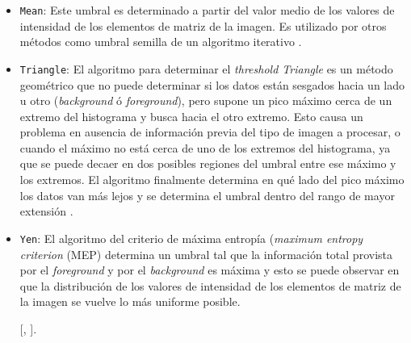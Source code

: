 \begin{itemize}
\item \texttt{Mean}: Este umbral es determinado a partir del valor medio de los valores de intensidad de los elementos de matriz de la imagen. Es utilizado por otros métodos como umbral semilla de un algoritmo iterativo \cite{GLASBEY}. 

\item \texttt{Triangle}: El algoritmo para determinar el \textit{threshold Triangle} es un método geométrico que no puede determinar si los datos están sesgados hacia un lado u otro (\textit{background} ó \textit{foreground}), pero supone un pico máximo cerca de un extremo del histograma y busca hacia el otro extremo. Esto causa un problema en ausencia de información previa del tipo de imagen a procesar, o cuando el máximo no está cerca de uno de los extremos del histograma, ya que se puede decaer en dos posibles regiones del umbral entre ese máximo y los extremos. El algoritmo finalmente determina en qué lado del pico máximo los datos van más lejos y se determina el umbral dentro del rango de mayor extensión \cite{triang}.

\item \texttt{Yen}: El algoritmo del criterio de máxima entropía (\textit{maximum entropy criterion} (MEP) determina un umbral tal que la información total provista por el \textit{foreground} y por el \textit{background} es máxima y esto se puede observar en que la distribución de los valores de intensidad de los elementos de matriz de la imagen se vuelve lo más uniforme posible. 




[\cite{yen}, \cite{yen2}].

\end{itemize}


